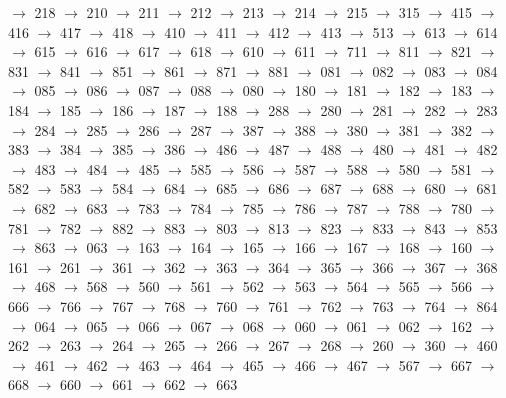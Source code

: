 $\rightarrow$ 218 $\rightarrow$ 210 $\rightarrow$ 211 $\rightarrow$ 212 $\rightarrow$ 213 $\rightarrow$ 214 $\rightarrow$ 215 $\rightarrow$ 315 $\rightarrow$ 415 $\rightarrow$ 416 $\rightarrow$ 417 $\rightarrow$ 418 $\rightarrow$ 410 $\rightarrow$ 411 $\rightarrow$ 412 $\rightarrow$ 413 $\rightarrow$ 513 $\rightarrow$ 613 $\rightarrow$ 614 $\rightarrow$ 615 $\rightarrow$ 616 $\rightarrow$ 617 $\rightarrow$ 618 $\rightarrow$ 610 $\rightarrow$ 611 $\rightarrow$ 711 $\rightarrow$ 811 $\rightarrow$ 821 $\rightarrow$ 831 $\rightarrow$ 841 $\rightarrow$ 851 $\rightarrow$ 861 $\rightarrow$ 871 $\rightarrow$ 881 $\rightarrow$ 081 $\rightarrow$ 082 $\rightarrow$ 083 $\rightarrow$ 084 $\rightarrow$ 085 $\rightarrow$ 086 $\rightarrow$ 087 $\rightarrow$ 088 $\rightarrow$ 080 $\rightarrow$ 180 $\rightarrow$ 181 $\rightarrow$ 182 $\rightarrow$ 183 $\rightarrow$ 184 $\rightarrow$ 185 $\rightarrow$ 186 $\rightarrow$ 187 $\rightarrow$ 188 $\rightarrow$ 288 $\rightarrow$ 280 $\rightarrow$ 281 $\rightarrow$ 282 $\rightarrow$ 283 $\rightarrow$ 284 $\rightarrow$ 285 $\rightarrow$ 286 $\rightarrow$ 287 $\rightarrow$ 387 $\rightarrow$ 388 $\rightarrow$ 380 $\rightarrow$ 381 $\rightarrow$ 382 $\rightarrow$ 383 $\rightarrow$ 384 $\rightarrow$ 385 $\rightarrow$ 386 $\rightarrow$ 486 $\rightarrow$ 487 $\rightarrow$ 488 $\rightarrow$ 480 $\rightarrow$ 481 $\rightarrow$ 482 $\rightarrow$ 483 $\rightarrow$ 484 $\rightarrow$ 485 $\rightarrow$ 585 $\rightarrow$ 586 $\rightarrow$ 587 $\rightarrow$ 588 $\rightarrow$ 580 $\rightarrow$ 581 $\rightarrow$ 582 $\rightarrow$ 583 $\rightarrow$ 584 $\rightarrow$ 684 $\rightarrow$ 685 $\rightarrow$ 686 $\rightarrow$ 687 $\rightarrow$ 688 $\rightarrow$ 680 $\rightarrow$ 681 $\rightarrow$ 682 $\rightarrow$ 683 $\rightarrow$ 783 $\rightarrow$ 784 $\rightarrow$ 785 $\rightarrow$ 786 $\rightarrow$ 787 $\rightarrow$ 788 $\rightarrow$ 780 $\rightarrow$ 781 $\rightarrow$ 782 $\rightarrow$ 882 $\rightarrow$ 883 $\rightarrow$ 803 $\rightarrow$ 813 $\rightarrow$ 823 $\rightarrow$ 833 $\rightarrow$ 843 $\rightarrow$ 853 $\rightarrow$ 863 $\rightarrow$ 063 $\rightarrow$ 163 $\rightarrow$ 164 $\rightarrow$ 165 $\rightarrow$ 166 $\rightarrow$ 167 $\rightarrow$ 168 $\rightarrow$ 160 $\rightarrow$ 161 $\rightarrow$ 261 $\rightarrow$ 361 $\rightarrow$ 362 $\rightarrow$ 363 $\rightarrow$ 364 $\rightarrow$ 365 $\rightarrow$ 366 $\rightarrow$ 367 $\rightarrow$ 368 $\rightarrow$ 468 $\rightarrow$ 568 $\rightarrow$ 560 $\rightarrow$ 561 $\rightarrow$ 562 $\rightarrow$ 563 $\rightarrow$ 564 $\rightarrow$ 565 $\rightarrow$ 566 $\rightarrow$ 666 $\rightarrow$ 766 $\rightarrow$ 767 $\rightarrow$ 768 $\rightarrow$ 760 $\rightarrow$ 761 $\rightarrow$ 762 $\rightarrow$ 763 $\rightarrow$ 764 $\rightarrow$ 864 $\rightarrow$ 064 $\rightarrow$ 065 $\rightarrow$ 066 $\rightarrow$ 067 $\rightarrow$ 068 $\rightarrow$ 060 $\rightarrow$ 061 $\rightarrow$ 062 $\rightarrow$ 162 $\rightarrow$ 262 $\rightarrow$ 263 $\rightarrow$ 264 $\rightarrow$ 265 $\rightarrow$ 266 $\rightarrow$ 267 $\rightarrow$ 268 $\rightarrow$ 260 $\rightarrow$ 360 $\rightarrow$ 460 $\rightarrow$ 461 $\rightarrow$ 462 $\rightarrow$ 463 $\rightarrow$ 464 $\rightarrow$ 465 $\rightarrow$ 466 $\rightarrow$ 467 $\rightarrow$ 567 $\rightarrow$ 667 $\rightarrow$ 668 $\rightarrow$ 660 $\rightarrow$ 661 $\rightarrow$ 662 $\rightarrow$ 663 